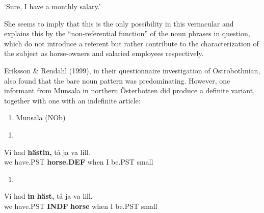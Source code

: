 ‘Sure, I have a monthly salary.’
\z


She seems to imply that this is the only possibility in this vernacular and explains this by the “non-referential function” of the noun phrases in question, which do not introduce a referent but rather contribute to the characterization of the subject as horse-owners and salaried employees respectively. 

Eriksson \& Rendahl (1999), in their questionnaire investigation of Ostrobothnian, also found that the bare noun pattern was predominating. However, one informant from Munsala in northern Österbotten did produce a definite variant, together with one with an indefinite article:

\begin{enumerate} %
\item 
Munsala (NOb)

\end{enumerate} %
\setcounter{listLFOxcviiileveli}{0}
\begin{enumerate} %
\item 
\end{enumerate} %
\ea\label{}
\gll Vi  had  \textbf{hästin,} tå  ja  va  lill.\\


we  have.PST  \textbf{horse.DEF} when  I   be.PST  small\\ %


\begin{enumerate} %
\item 
\end{enumerate} %
\ea\label{}
\gll Vi  had  \textbf{in} \textbf{häst,} tå  ja  va  lill.\\


we  have.PST  \textbf{INDF} \textbf{horse} when  I  be.PST  small\\ %


